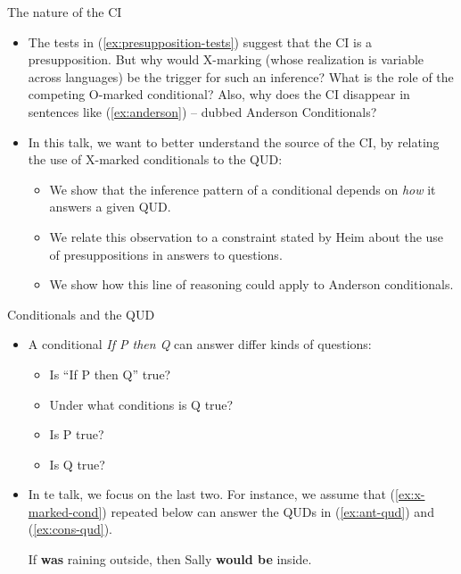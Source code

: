 \documentclass[10pt]{beamer}
\begin{document}
\begin{frame}{The nature of the CI}
	\begin{itemize}
		\item The tests in (\ref{ex:presupposition-tests}) suggest that the CI is a presupposition. But why would X-marking (whose realization is variable across languages) be the trigger for such an inference? What is the role of the competing O-marked conditional? Also, why does the CI disappear in sentences like (\ref{ex:anderson}) -- dubbed Anderson Conditionals?
	\end{itemize}
	\begin{exe}
		\label{ex:anderson}
	\end{exe}
	\begin{itemize}
		\item In this talk, we want to better understand the source of the CI, by relating the use of X-marked conditionals to the QUD:
		\begin{itemize}
			\item We show that the inference pattern of a conditional depends on \textit{how} it answers a given QUD.
			\item We relate this observation to a constraint stated by Heim about the use of presuppositions in answers to questions.
			\item We show how this line of reasoning could apply to Anderson conditionals.
		\end{itemize}
	\end{itemize}
\end{frame}

\begin{frame}{Conditionals and the QUD}
	\begin{itemize}
		\item A conditional \textit{If P then Q} can answer differ kinds of questions:
		\begin{itemize}
			\item Is ``If P then Q'' true?
			\item Under what conditions is Q true?
			\item Is P true?
			\item Is Q true?
		\end{itemize}
		\item In te talk, we focus on the last two. For instance, we assume that (\ref{ex:x-marked-cond}) repeated below can answer the QUDs in (\ref{ex:ant-qud}) and (\ref{ex:cons-qud}).
		\begin{exe}
			\exr{ex:x-marked-cond} 
			{If \textbf{was} raining outside, then Sally \textbf{would be} inside.}
			 \label{ex:ant-qud}
			\label{ex:cons-qud}
		\end{exe}
	\end{itemize}
\end{frame}
\end{document}
